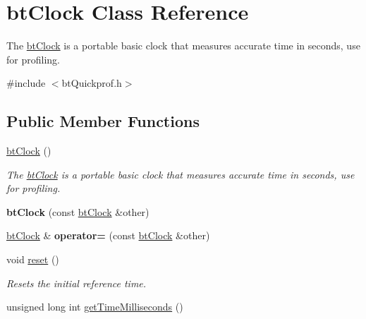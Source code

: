 \hypertarget{classbtClock}{}\section{bt\+Clock Class Reference}
\label{classbtClock}


The \hyperlink{classbtClock}{bt\+Clock} is a portable basic clock that measures accurate time in seconds, use for profiling.  




{\ttfamily \#include $<$bt\+Quickprof.\+h$>$}

\subsection*{Public Member Functions}
\begin{DoxyCompactItemize}
\item 
\mbox{\label{classbtClock_ac169d73599151d07b6449505d7c66738}} 
\hyperlink{classbtClock_ac169d73599151d07b6449505d7c66738}{bt\+Clock} ()
\begin{DoxyCompactList}\small\item\em The \hyperlink{classbtClock}{bt\+Clock} is a portable basic clock that measures accurate time in seconds, use for profiling. \end{DoxyCompactList}\item 
\mbox{\label{classbtClock_a16cbad5225f0d2ab96e18e7e9b864ca6}} 
{\bfseries bt\+Clock} (const \hyperlink{classbtClock}{bt\+Clock} \&other)
\item 
\mbox{\label{classbtClock_ac3f55e1187c51b9ad6827b53243db170}} 
\hyperlink{classbtClock}{bt\+Clock} \& {\bfseries operator=} (const \hyperlink{classbtClock}{bt\+Clock} \&other)
\item 
\mbox{\label{classbtClock_a592eb764c2e7b645c9619ab7e483166c}} 
void \hyperlink{classbtClock_a592eb764c2e7b645c9619ab7e483166c}{reset} ()
\begin{DoxyCompactList}\small\item\em Resets the initial reference time. \end{DoxyCompactList}\item 
unsigned long int \hyperlink{classbtClock_ae2c3da98828b79c1966c47c20b45b32f}{get\+Time\+Milliseconds} ()
\item 

\end{DoxyCompactItemize}

